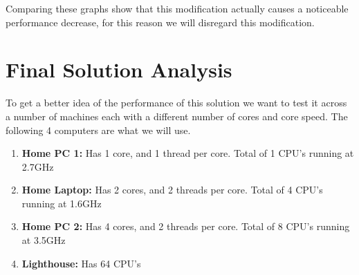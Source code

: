 \documentclass[a4paper, 12pt]{article}
\begin{document}
			Comparing these graphs show that this modification actually causes a noticeable performance decrease, for this reason we will disregard this modification.
		
	
	\section{Final Solution Analysis}  	
		To get a better idea of the performance of this solution we want to test it across a number of machines each with a different number of cores and core speed. The following 4 computers are what we will use.
		
		\begin{enumerate}
			\item \textbf{Home PC 1:} Has 1 core, and 1 thread per core. Total of 1 CPU's running at 2.7GHz
			
			\item \textbf{Home Laptop:} Has 2 cores, and 2 threads per core. Total of 4 CPU's running at 1.6GHz
			
			\item \textbf{Home PC 2:} Has 4 cores, and 2 threads per core. Total of 8 CPU's running at 3.5GHz
			
			\item \textbf{Lighthouse:} Has 64 CPU's
		\end{enumerate}
		
\end{document}
